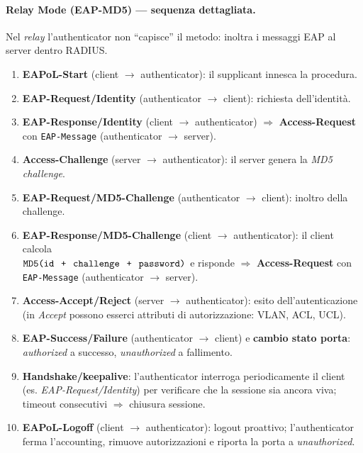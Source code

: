 \paragraph{Relay Mode (EAP-MD5) — sequenza dettagliata.}
Nel \emph{relay} l’authenticator non “capisce” il metodo: inoltra i messaggi EAP al server dentro RADIUS.
\begin{enumerate}
  \item \textbf{EAPoL-Start} (client $\rightarrow$ authenticator): il supplicant innesca la procedura.
  \item \textbf{EAP-Request/Identity} (authenticator $\rightarrow$ client): richiesta dell’identità.
  \item \textbf{EAP-Response/Identity} (client $\rightarrow$ authenticator) $\Rightarrow$
        \textbf{Access-Request} con \texttt{EAP-Message} (authenticator $\rightarrow$ server).
  \item \textbf{Access-Challenge} (server $\rightarrow$ authenticator): il server genera la \emph{MD5 challenge}.
  \item \textbf{EAP-Request/MD5-Challenge} (authenticator $\rightarrow$ client): inoltro della challenge.
  \item \textbf{EAP-Response/MD5-Challenge} (client $\rightarrow$ authenticator): il client calcola\\
        \(\texttt{MD5(id \,+\, challenge \,+\, password)}\) e risponde $\Rightarrow$
        \textbf{Access-Request} con \texttt{EAP-Message} (authenticator $\rightarrow$ server).
  \item \textbf{Access-Accept/Reject} (server $\rightarrow$ authenticator): esito dell’autenticazione
        (in \emph{Accept} possono esserci attributi di autorizzazione: VLAN, ACL, UCL).
  \item \textbf{EAP-Success/Failure} (authenticator $\rightarrow$ client) e \textbf{cambio stato porta}:
        \emph{authorized} a successo, \emph{unauthorized} a fallimento.
  \item \textbf{Handshake/keepalive}: l’authenticator interroga periodicamente il client (es. \textit{EAP-Request/Identity})
        per verificare che la sessione sia ancora viva; timeout consecutivi $\Rightarrow$ chiusura sessione.
  \item \textbf{EAPoL-Logoff} (client $\rightarrow$ authenticator): logout proattivo; l’authenticator ferma l’accounting,
        rimuove autorizzazioni e riporta la porta a \emph{unauthorized}.
\end{enumerate}


